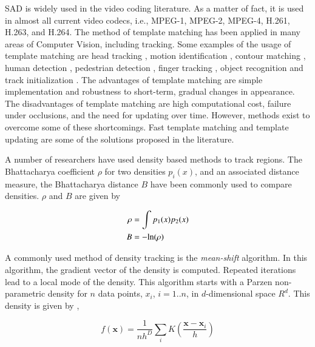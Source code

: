 SAD is widely used in the video coding literature.  As a matter of fact, it is used in almost all current video codecs, i.e., MPEG-1, MPEG-2, MPEG-4, H.261, H.263, and H.264.  The method of template matching has been applied in many areas of Computer Vision, including tracking.  Some examples of the usage of template matching are head tracking \cite{1998_CNF_HeadTracking_Birchfield}, motion identification \cite{1998_CNF_Tracking_Lipton, 2001_JNL_MotionTemplates_Bobick}, contour matching \cite{2009_CNF_HumanDetection_Beleznai}, human detection \cite{2010_JNL_HumanDetectionSegmentation_Lin}, pedestrian detection \cite{1997_CNF_PedestrianDetection_Oren}, finger tracking \cite{1995_CNF_Tracking_Rehg}, object recognition \cite{2000_CNF_MLtemplateMatching_Olson} and track initialization \cite{1998_CNF_Tracking_Lipton, 2010_CNF_TrkRVQ_Aslam}.  The advantages of template matching are simple implementation and robustness to short-term, gradual changes in appearance.  The disadvantages of template matching are high computational cost, failure under occlusions, and the need for updating over time.  However, methods exist to overcome some of these shortcomings.  Fast template matching \cite{2002_CNF_FastTemplateMatching_SchweitzerBellWu} and template updating are some of the solutions \cite{1998_CNF_Tracking_Lipton} proposed in the literature.

A number of researchers have used density based methods to track regions.  The Bhattacharya coefficient $\rho$ for two densities $p_i(x)$, and an associated distance measure, the Bhattacharya distance $B$ \cite{1967_JNL_Bhattacharyya_Kailath} have been commonly used to compare densities.  $\rho$ and $B$ are given by 

\begin{align}
\rho &= \int p_1(x)p_2(x) \notag\\
B &= -\text{ln}(\rho)
\label{Eq:Bhattacharya}
\end{align}

A commonly used method of density tracking is the \emph{mean-shift} algorithm.  In this algorithm, the gradient vector of the density is computed.  Repeated iterations lead to a local mode of the density.  This algorithm starts with a Parzen non-parametric density for $n$ data points, $x_i$, $i=1..n$, in $d$-dimensional space $R^d$.  This density is given by \cite{2007_BOOK_PRML_Bishop},

\begin{equation}
f(\mathbf{x}) = \frac{1}{nh^D}\sum_i K(\frac{\mathbf{x}-\mathbf{x}_i}{h})
\label{Eq:ParzenDensity}
\end{equation} 

